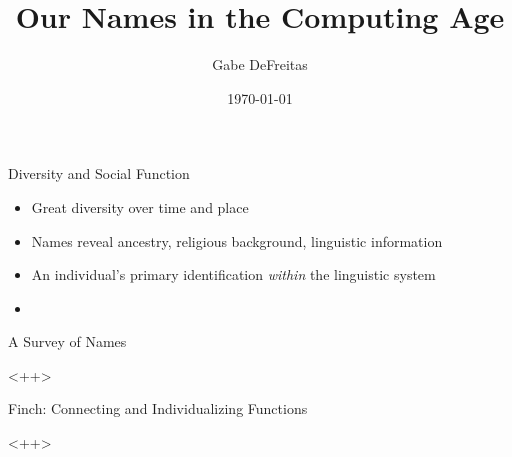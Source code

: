 \documentclass{beamer}
\title{Our Names in the Computing Age}
\date{\today}
\author{Gabe DeFreitas}
\begin{document}
\maketitle

\begin{frame}{Diversity and Social Function}
\begin{itemize}
\item Great diversity over time and place
\item Names reveal ancestry, religious background, linguistic information
\item An individual's primary identification \textit{within} the linguistic
  system
\item 
\end{itemize}
\end{frame}

\begin{frame}{A Survey of Names}

<++>

\end{frame}

\begin{frame}{Finch: Connecting and Individualizing Functions}

<++>

\end{frame}
\end{document}
